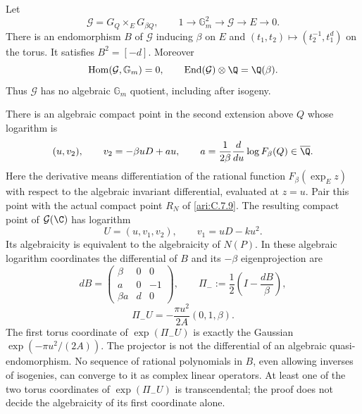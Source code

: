 \begin{proposition}\label{ari:C.7.10}
Let
\[
 \mathcal G=G_Q\mathbin{\times_E}G_{\beta Q},\qquad
 1\longrightarrow\mathbb G_m^2\longrightarrow\mathcal G
       \longrightarrow E\longrightarrow0.
\]
There is an endomorphism $B$ of $\mathcal G$ inducing
$\beta$ on $E$ and
$(t_1,t_2)\mapsto(t_2^{-1},t_1^d)$ on the torus.
It satisfies $B^2=[-d]$. Moreover
\[
 \operatorname{Hom}(\mathcal G,\mathbb G_m)=0,
 \qquad
 \operatorname{End}(\mathcal G)\otimes\Q=\Q(\beta).
\]
Thus $\mathcal G$ has no algebraic $\mathbb G_m$ quotient,
including after isogeny.

There is an algebraic compact point in the second extension
above $Q$ whose logarithm is
\[
 (u,v_2),\qquad v_2=-\beta uD+au,
 \qquad
 a=\frac1{2\beta}
       \frac{d}{du}\log F_\beta(Q)\in\overline\Q.
\]
Here the derivative means differentiation of the rational
function $F_\beta(\exp_E z)$ with respect to the algebraic
invariant differential, evaluated at $z=u$.
Pair this point with the actual compact point $R_N$ of
\ref{ari:C.7.9}. The resulting compact point of $\mathcal G(\C)$
has logarithm
\[
 U=(u,v_1,v_2),\qquad v_1=uD-ku^2.
\]
Its algebraicity is equivalent to the algebraicity of $N(P)$.
In these algebraic logarithm coordinates the differential of
$B$ and its $-\beta$ eigenprojection are
\[
 dB=\begin{pmatrix}
 \beta&0&0\\ a&0&-1\\ \beta a&d&0
 \end{pmatrix},\qquad
 \Pi_-:=\frac12\left(I-\frac{dB}{\beta}\right),
\]
\[
 \Pi_-U=-\frac{\pi u^2}{2A}(0,1,\beta).
\]
The first torus coordinate of $\exp(\Pi_-U)$ is exactly
the Gaussian $\exp(-\pi u^2/(2A))$. The projector is not
the differential of an algebraic quasi-endomorphism. No
sequence of rational polynomials in $B$, even allowing
inverses of isogenies, can converge to it as complex linear
operators. At least one of the two torus coordinates of
$\exp(\Pi_-U)$ is transcendental; the proof does not decide the
algebraicity of its first coordinate alone.
\end{proposition}

